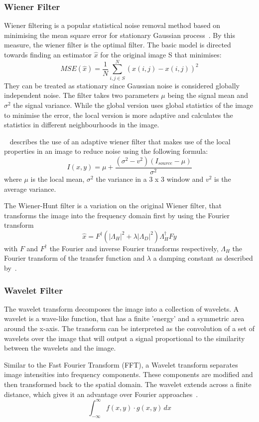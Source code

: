 \documentclass[a4paper, 12pt]{report}
\begin{document}
\subsubsection{Wiener Filter}
Wiener filtering is a popular statistical noise removal method based on minimising the mean square error for stationary Gaussian process~\cite{jin2003adaptive}. By this measure, the wiener filter is the optimal filter.
The basic model is directed towards finding an estimator \(\hat{x}\) for the original image S that minimises:
\[MSE(\hat{x})=\frac{1}{N} \sum_{i,j\in S}^{N}(\hat{x}(i,j)-x(i,j))^2\]
They can be treated as stationary since Gaussian noise is considered globally independent noise. The filter takes two parameters \(\mu\) being the signal mean and \(\sigma^2\) the signal variance. While the global version uses global statistics of the image to minimise the error, the local version is more adaptive and calculates the statistics in different neighbourhoods in the image.
\par

~\cite{gatos2006adaptive} describes the use of an adaptive wiener filter that makes use of the local properties in an image to reduce noise using the following formula:
\[I(x,y)=\mu+\frac{(\sigma^2-v^2)(I_{source}-\mu)}{\sigma^2}\]
where \(\mu\) is the local mean, \(\sigma^2\) the variance in a 3 x 3 window and \(v^2\) is the average variance.
\par
The Wiener-Hunt filter is a variation on the original Wiener filter, that transforms the image into the frequency domain first by using the Fourier transform
\[\hat x = F^\dagger (|\Lambda_H|^2 + \lambda |\Lambda_D|^2)
    \Lambda_H^\dagger F y\]
with \(F\) and \(F^\dagger\) the Fourier and inverse Fourier transforms respectively, \(\Lambda_H\) the Fourier transform of the transfer function and \(\lambda\) a damping constant as described by~\cite{scikit-image}.

\subsubsection{Wavelet Filter}
The wavelet transform decomposes the image into a collection of wavelets. A wavelet is a wave-like function, that has a finite 'energy' and a symmetric area around the x-axis. The transform can be interpreted as the convolution of a set of wavelets over the image that will output a signal proportional to the similarity between the wavelets and the image.\par

Similar to the Fast Fourier Transform (FFT), a Wavelet transform separates image intensities into frequency components. These components are modified and then transformed back to the spatial domain. The wavelet extends across a finite distance, which gives it an advantage over Fourier approaches~\cite{wavelet_filtering_2022}.
\[ \int_{-\infty}^{\infty} f(x,y) \cdot g(x,y) \,dx \]
\end{document}
